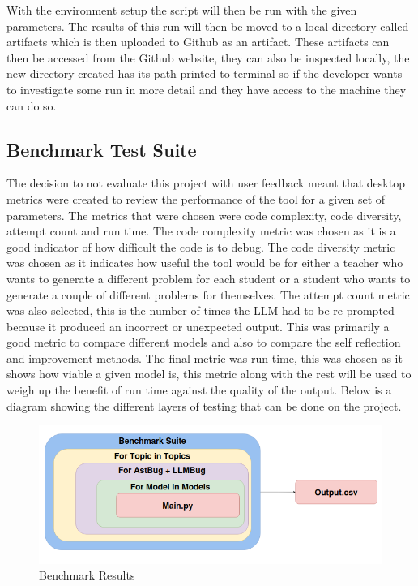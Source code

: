 \documentclass[12pt]{extarticle}
\begin{document}
With the environment setup the script will then be run with the given parameters. The results of this run will then be moved to a local directory called artifacts which is then uploaded to Github as an artifact. These artifacts can then be accessed from the Github website, they can also be inspected locally, the new directory created has its path printed to terminal so if the developer wants to investigate some run in more detail and they have access to the machine they can do so.

\subsection{Benchmark Test Suite}

The decision to not evaluate this project with user feedback meant that desktop metrics were created to review the performance of the tool for a given set of parameters. The metrics that were chosen were code complexity, code diversity, attempt count and run time. The code complexity metric was chosen as it is a good indicator of how difficult the code is to debug. The code diversity metric was chosen as it indicates how useful the tool would be for either a teacher who wants to generate a different problem for each student or a student who wants to generate a couple of different problems for themselves. The attempt count metric was also selected, this is the number of times the LLM had to be re-prompted because it produced an incorrect or unexpected output. This was primarily a good metric to compare different models and also to compare the self reflection and improvement methods. The final metric was run time, this was chosen as it shows how viable a given model is, this metric along with the rest will be used to weigh up the benefit of run time against the quality of the output. Below is a diagram showing the different layers of testing that can be done on the project.

\begin{figure}[H]
\centering
\includegraphics[width=0.7\linewidth]{Images/Benchmark.png}
\caption{Benchmark Results}
\label{fig:benchmark_results}
\end{figure}
\end{document}
